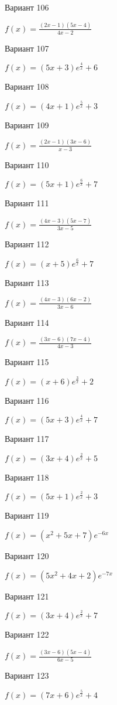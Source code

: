 \documentclass[11pt]{report}
\begin{document}
Вариант 106

$f(x) = \frac{\left(2 x - 1\right) \left(5 x - 4\right)}{4 x - 2}$

Вариант 107

$f(x) = \left(5 x + 3\right) e^{\frac{4}{x}} + 6$

Вариант 108

$f(x) = \left(4 x + 1\right) e^{\frac{5}{x}} + 3$

Вариант 109

$f(x) = \frac{\left(2 x - 1\right) \left(3 x - 6\right)}{x - 3}$

Вариант 110

$f(x) = \left(5 x + 1\right) e^{\frac{6}{x}} + 7$

Вариант 111

$f(x) = \frac{\left(4 x - 3\right) \left(5 x - 7\right)}{3 x - 5}$

Вариант 112

$f(x) = \left(x + 5\right) e^{\frac{6}{x}} + 7$

Вариант 113

$f(x) = \frac{\left(4 x - 3\right) \left(6 x - 2\right)}{3 x - 6}$

Вариант 114

$f(x) = \frac{\left(3 x - 6\right) \left(7 x - 4\right)}{4 x - 3}$

Вариант 115

$f(x) = \left(x + 6\right) e^{\frac{3}{x}} + 2$

Вариант 116

$f(x) = \left(5 x + 3\right) e^{\frac{4}{x}} + 7$

Вариант 117

$f(x) = \left(3 x + 4\right) e^{\frac{2}{x}} + 5$

Вариант 118

$f(x) = \left(5 x + 1\right) e^{\frac{2}{x}} + 3$

Вариант 119

$f(x) = \left(x^{2} + 5 x + 7\right) e^{- 6 x}$

Вариант 120

$f(x) = \left(5 x^{2} + 4 x + 2\right) e^{- 7 x}$

Вариант 121

$f(x) = \left(3 x + 4\right) e^{\frac{2}{x}} + 7$

Вариант 122

$f(x) = \frac{\left(3 x - 6\right) \left(5 x - 4\right)}{6 x - 5}$

Вариант 123

$f(x) = \left(7 x + 6\right) e^{\frac{5}{x}} + 4$
\end{document}
